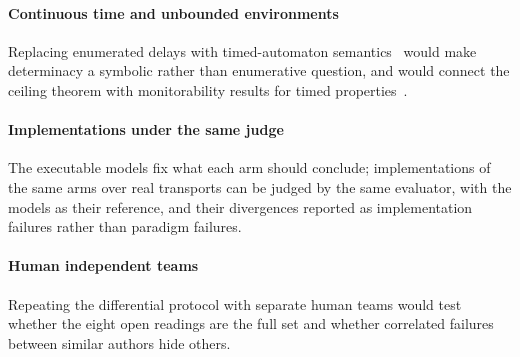 \paragraph{Continuous time and unbounded environments} Replacing enumerated delays with timed-automaton semantics~\cite{alur1994timed} would make determinacy a symbolic rather than enumerative question, and would connect the ceiling theorem with monitorability results for timed properties~\cite{bauer2011runtime,francalanza2017monitorability}.

\paragraph{Implementations under the same judge} The executable models fix what each arm should conclude; implementations of the same arms over real transports can be judged by the same evaluator, with the models as their reference, and their divergences reported as implementation failures rather than paradigm failures.

\paragraph{Human independent teams} Repeating the differential protocol with separate human teams would test whether the eight open readings are the full set and whether correlated failures between similar authors hide others.
